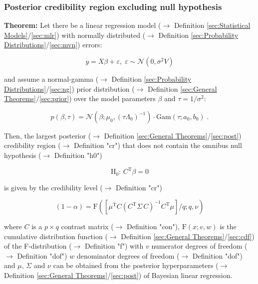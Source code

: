 \documentclass[a4paper,12pt,twoside]{book}
\begin{document}
\subsubsection[\textbf{Posterior credibility region excluding null hypothesis}]{Posterior credibility region excluding null hypothesis} \label{sec:blr-pcr}
\setcounter{equation}{0}

\textbf{Theorem:} Let there be a linear regression model ($\rightarrow$ Definition \ref{sec:Statistical Models}/\ref{sec:mlr}) with normally distributed ($\rightarrow$ Definition \ref{sec:Probability Distributions}/\ref{sec:mvn}) errors:

\begin{equation} \label{eq:blr-pcr-GLM}
y = X \beta + \varepsilon, \; \varepsilon \sim \mathcal{N}(0, \sigma^2 V)
\end{equation}

and assume a normal-gamma ($\rightarrow$ Definition \ref{sec:Probability Distributions}/\ref{sec:ng}) prior distribution ($\rightarrow$ Definition \ref{sec:General Theorems}/\ref{sec:prior}) over the model parameters $\beta$ and $\tau = 1/\sigma^2$:

\begin{equation} \label{eq:blr-pcr-GLM-NG-prior}
p(\beta,\tau) = \mathcal{N}(\beta; \mu_0, (\tau \Lambda_0)^{-1}) \cdot \mathrm{Gam}(\tau; a_0, b_0) \; .
\end{equation}

Then, the largest posterior ($\rightarrow$ Definition \ref{sec:General Theorems}/\ref{sec:post}) credibility region ($\rightarrow$ Definition "cr") that does not contain the omnibus null hypothesis ($\rightarrow$ Definition "h0")

\begin{equation} \label{eq:blr-pcr-GLM-H0}
\mathrm{H}_0: \, C^\mathrm{T} \beta = 0
\end{equation}

is given by the credibility level ($\rightarrow$ Definition "cr")

\begin{equation} \label{eq:blr-pcr-GLM-NG-PCR}
(1-\alpha) = \mathrm{F}\left( \left[ \mu^\mathrm{T} C (C^\mathrm{T} \Sigma \, C)^{-1} C^\mathrm{T} \mu \right]/q; q, \nu \right)
\end{equation}

where $C$ is a $p \times q$ contrast matrix ($\rightarrow$ Definition "con"), $\mathrm{F}(x; v, w)$ is the cumulative distribution function ($\rightarrow$ Definition \ref{sec:General Theorems}/\ref{sec:cdf}) of the F-distribution ($\rightarrow$ Definition "f") with $v$ numerator degrees of freedom ($\rightarrow$ Definition "dof") $w$ denominator degrees of freedom ($\rightarrow$ Definition "dof") and $\mu$, $\Sigma$ and $\nu$ can be obtained from the posterior hyperparameters ($\rightarrow$ Definition \ref{sec:General Theorems}/\ref{sec:post}) of Bayesian linear regression.
\end{document}
